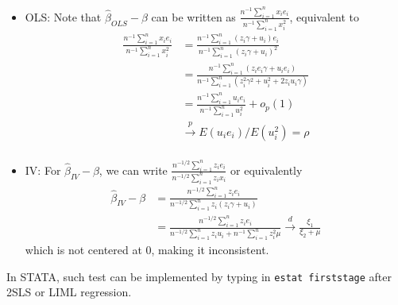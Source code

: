 \begin{itemize}
\item OLS: Note that $\hat{\beta}_{OLS}-\beta$ can be written as $\frac{n^{-1}\sum_{i=1}^n x_ie_i}{n^{-1}\sum_{i=1}^nx_i^2}$, equivalent to
\footnotesize{\[
\begin{aligned}
\frac{n^{-1}\sum_{i=1}^n x_ie_i}{n^{-1}\sum_{i=1}^nx_i^2}&=\frac{n^{-1}\sum_{i=1}^n (z_i\gamma+u_i)e_i}{n^{-1}\sum_{i=1}^n(z_i\gamma+u_i)^2}\\
&=\frac{n^{-1}\sum_{i=1}^n (z_ie_i\gamma+u_ie_i)}{n^{-1}\sum_{i=1}^n(z_i^2\gamma^2+u_i^2+2z_iu_i\gamma)}\\
&=\frac{n^{-1}\sum_{i=1}^n u_ie_i}{n^{-1}\sum_{i=1}^nu_i^2}+o_p(1)\\
&\xrightarrow{p}E(u_ie_i)/E(u_i^2)=\rho\\
\end{aligned}
\]}\normalsize
\item IV: For $\hat{\beta}_{IV}-\beta$, we can write $\frac{n^{-1/2}\sum_{i=1}^n z_ie_i}{n^{-1/2}\sum_{i=1}^nz_ix_i}$ or equivalently
\footnotesize{\[
\begin{aligned}
\hat{\beta}_{IV}-\beta&=\frac{n^{-1/2}\sum_{i=1}^n z_ie_i}{n^{-1/2}\sum_{i=1}^nz_i(z_i\gamma+u_i)}\\
&=\frac{n^{-1/2}\sum_{i=1}^n z_ie_i}{n^{-1/2}\sum_{i=1}^nz_iu_i+n^{-1}\sum_{i=1}^n z_i^2\mu}\xrightarrow{d}\frac{\xi_1}{\xi_2+\mu}
\end{aligned}
\]}\normalsize
which is not centered at 0, making it inconsistent. 
\end{itemize}\par
In STATA, such test can be implemented by typing in \texttt{estat firststage} after 2SLS or LIML regression. 

